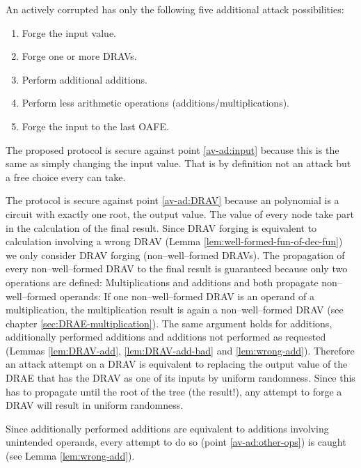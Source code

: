An actively corrupted \JWpTwo{} has only the following five additional attack
possibilities:

\begin{enumerate}

\item \label{av-ad:input} Forge the input value.

\item \label{av-ad:DRAV} Forge one or more DRAVs.

\item \label{av-ad:other-ops} Perform additional additions.

\item \label{av-ad:less-ops} Perform less arithmetic operations
  (additions/multiplications).

\item \label{av-ad:last-OAFE} Forge the input to the last OAFE.

\end{enumerate}


The proposed protocol is secure against point \ref{av-ad:input} because this is
the same as simply changing the input value. That is by definition not an attack
but a free choice every \JWpTwo{} can take.

The protocol is secure against point \ref{av-ad:DRAV} because an polynomial is a
circuit with exactly one root, the output value. The value of every node take
part in the calculation of the final result. Since DRAV forging is equivalent to
calculation involving a wrong DRAV (Lemma \ref{lem:well-formed-fun-of-dec-fun})
we only consider DRAV forging (non--well--formed DRAVs). The propagation of
every non--well--formed DRAV to the final result is guaranteed because only two
operations are defined: Multiplications and additions and both propagate
non--well--formed operands: If one non--well--formed DRAV is an operand of a
multiplication, the multiplication result is again a non--well--formed DRAV (see
chapter \ref{sec:DRAE-multiplication}). The same argument holds for additions,
additionally performed additions and additions not performed as requested
(Lemmas \ref{lem:DRAV-add}, \ref{lem:DRAV-add-bad} and \ref{lem:wrong-add}).
Therefore an attack attempt on a DRAV is equivalent to replacing the output
value of the DRAE that has the DRAV as one of its inputs by uniform randomness.
Since this has to propagate until the root of the tree (the result!), any
attempt to forge a DRAV will result in uniform randomness.

Since additionally performed additions are equivalent to additions involving
unintended operands, every attempt to do so (point \ref{av-ad:other-ops}) is
caught (see Lemma \ref{lem:wrong-add}).

